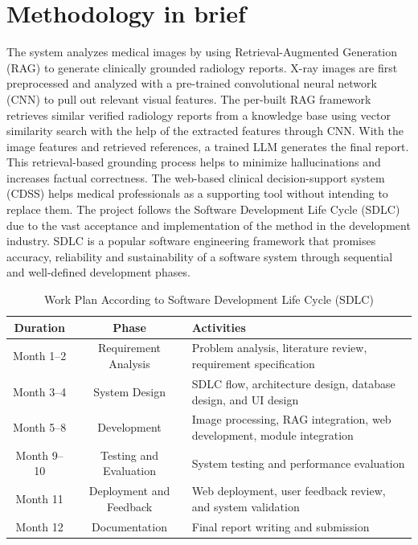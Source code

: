 \section{Methodology in brief}
The system analyzes medical images by using Retrieval-Augmented Generation (RAG) to
generate clinically grounded radiology reports. X-ray images are first preprocessed and analyzed
with a pre-trained convolutional neural network (CNN) to pull out relevant visual features. The
per-built RAG framework retrieves similar verified radiology reports from a knowledge base
using vector similarity search with the help of the extracted features through CNN. With the
image features and retrieved references, a trained LLM generates the final report. This
retrieval-based grounding process helps to minimize hallucinations and increases factual
correctness. The web-based clinical decision-support system (CDSS) helps medical professionals
as a supporting tool without intending to replace them.
The project follows the Software Development Life Cycle (SDLC) due to the vast acceptance
and implementation of the method in the development industry. SDLC is a popular software
engineering framework that promises accuracy, reliability and sustainability of a software system
through sequential and well-defined development phases\cite{Gurung2020}.

\begin{table}[h]
\centering
\caption{Work Plan According to Software Development Life Cycle (SDLC)}
\begin{tabular}{|c|c|p{7cm}|}
\hline
\textbf{Duration} & \textbf{Phase} & \textbf{Activities} \\ \hline

Month 1--2 & Requirement Analysis & 
Problem analysis, literature review, requirement specification \\ \hline

Month 3--4 & System Design & 
SDLC flow, architecture design, database design, and UI design \\ \hline

Month 5--8 & Development & 
Image processing, RAG integration, web development, module integration \\ \hline

Month 9--10 & Testing and Evaluation & 
System testing and performance evaluation \\ \hline

Month 11 & Deployment and Feedback & 
Web deployment, user feedback review, and system validation \\ \hline

Month 12 & Documentation & 
Final report writing and submission \\ \hline

\end{tabular}
\end{table}

